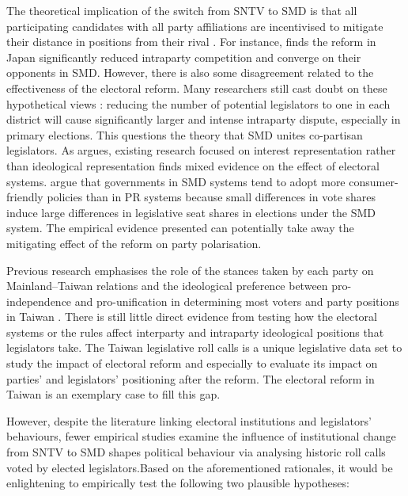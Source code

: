 The theoretical implication of the switch from SNTV to SMD is that all participating candidates with all party affiliations are incentivised to mitigate their distance in positions from their rival \citep{Downs1957, Duverger1954,Catalinac2016}. For instance, \citet{Catalinac2016} finds the reform in Japan significantly reduced intraparty competition and converge on their opponents in SMD. However, there is also some disagreement related to the effectiveness of the electoral reform. Many researchers still cast doubt on these hypothetical views \citep[e.g.,][]{Wu2003, Hirano2006}: reducing the number of potential legislators to one in each district will cause significantly larger and intense intraparty dispute, especially in primary elections. This questions the theory that SMD unites co-partisan legislators. As \citet{Rickard2018} argues, existing research focused on interest representation rather than ideological representation finds mixed evidence on the effect of electoral systems. \citet{Chang2010} argue that governments in SMD systems tend to adopt more consumer-friendly policies than in PR systems because small differences in vote shares induce large differences in legislative seat shares in elections under the SMD system. The empirical evidence presented can potentially take away the mitigating effect of the reform on party polarisation. 


Previous research emphasises the role of the stances taken by each party on Mainland–Taiwan relations and the ideological preference between pro-independence and pro-unification in determining most voters and party positions in Taiwan \citep[][]{Clark2012, Hsiao2012,Huang2005, Hsiao2012}. There is still little direct evidence from testing how the electoral systems or the rules affect interparty and intraparty ideological positions that legislators take. The Taiwan legislative roll calls is a unique legislative data set to study the impact of electoral reform and especially to evaluate its impact on parties' and legislators' positioning after the reform. The electoral reform in Taiwan is an exemplary case to fill this gap. 

However, despite the literature linking electoral institutions and legislators' behaviours, fewer empirical studies examine the influence of institutional change from SNTV to SMD shapes political behaviour via analysing historic roll calls voted by elected legislators.Based on the aforementioned rationales, it would be enlightening to empirically test the following two plausible hypotheses:

